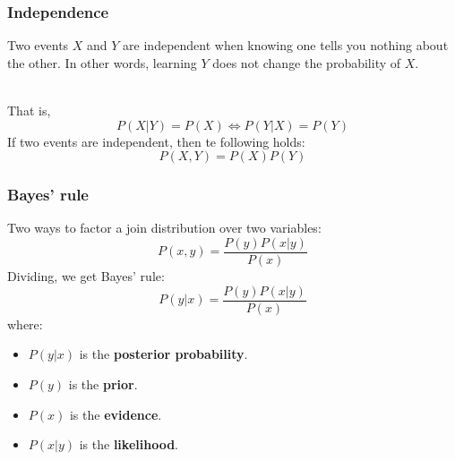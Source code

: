 \documentclass[11pt]{article}
\begin{document}
\subsubsection{Independence}
\begin{definition}
Two events $X$ and $Y$ are independent when knowing one tells you nothing about the other. In other words, learning $Y$ does not change the probability of $X$.
\end{definition}
$\quad$\\[-1em]
That is,
$$
P(X|Y)=P(X)\iff P(Y|X)=P(Y)
$$
If two events are independent, then te following holds:
$$
P(X,Y)=P(X)P(Y)
$$

\subsubsection{Bayes' rule}
Two ways to factor a join distribution over two variables:
$$
P(x,y)=\frac{P(y)P(x|y)}{P(x)}
$$
Dividing, we get Bayes' rule:
$$
\boxed{P(y|x)=\frac{P(y)P(x|y)}{P(x)}}
$$
where:
\begin{itemize}
    \item $P(y|x)$ is the \textbf{posterior probability}.
    \item $P(y)$ is the \textbf{prior}.
    \item $P(x)$ is the \textbf{evidence}.
    \item $P(x|y)$ is the \textbf{likelihood}.
\end{itemize}
\end{document}
